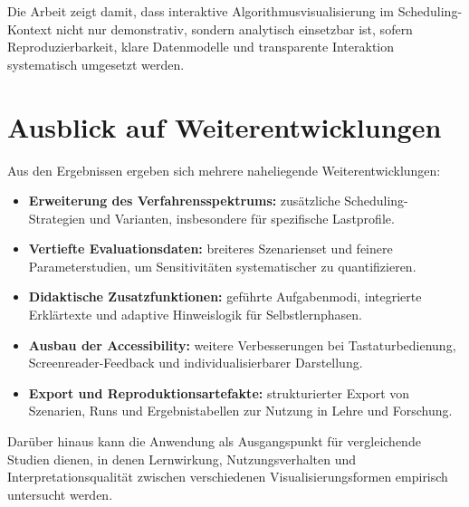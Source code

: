 Die Arbeit zeigt damit, dass interaktive Algorithmusvisualisierung im Scheduling-Kontext nicht nur demonstrativ, sondern analytisch einsetzbar ist, sofern Reproduzierbarkeit, klare Datenmodelle und transparente Interaktion systematisch umgesetzt werden.

\section{Ausblick auf Weiterentwicklungen}

Aus den Ergebnissen ergeben sich mehrere naheliegende Weiterentwicklungen:

\begin{itemize}
    \item \textbf{Erweiterung des Verfahrensspektrums:} zusätzliche Scheduling-Strategien und Varianten, insbesondere für spezifische Lastprofile.
    \item \textbf{Vertiefte Evaluationsdaten:} breiteres Szenarienset und feinere Parameterstudien, um Sensitivitäten systematischer zu quantifizieren.
    \item \textbf{Didaktische Zusatzfunktionen:} geführte Aufgabenmodi, integrierte Erklärtexte und adaptive Hinweislogik für Selbstlernphasen.
    \item \textbf{Ausbau der Accessibility:} weitere Verbesserungen bei Tastaturbedienung, Screenreader-Feedback und individualisierbarer Darstellung.
    \item \textbf{Export und Reproduktionsartefakte:} strukturierter Export von Szenarien, Runs und Ergebnistabellen zur Nutzung in Lehre und Forschung.
\end{itemize}

Darüber hinaus kann die Anwendung als Ausgangspunkt für vergleichende Studien dienen, in denen Lernwirkung, Nutzungsverhalten und Interpretationsqualität zwischen verschiedenen Visualisierungsformen empirisch untersucht werden.
